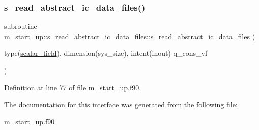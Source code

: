 \subsubsection{\texorpdfstring{s\+\_\+read\+\_\+abstract\+\_\+ic\+\_\+data\+\_\+files()}{s\_read\_abstract\_ic\_data\_files()}}
{\footnotesize\ttfamily subroutine m\+\_\+start\+\_\+up\+::s\+\_\+read\+\_\+abstract\+\_\+ic\+\_\+data\+\_\+files\+::s\+\_\+read\+\_\+abstract\+\_\+ic\+\_\+data\+\_\+files (\begin{DoxyParamCaption}\item[{type(\hyperlink{structm__derived__types_1_1scalar__field}{scalar\+\_\+field}), dimension(sys\+\_\+size), intent(inout)}]{q\+\_\+cons\+\_\+vf }\end{DoxyParamCaption})}



Definition at line 77 of file m\+\_\+start\+\_\+up.\+f90.



The documentation for this interface was generated from the following file\+:\begin{DoxyCompactItemize}
\item 
\hyperlink{m__start__up_8f90}{m\+\_\+start\+\_\+up.\+f90}\end{DoxyCompactItemize}
